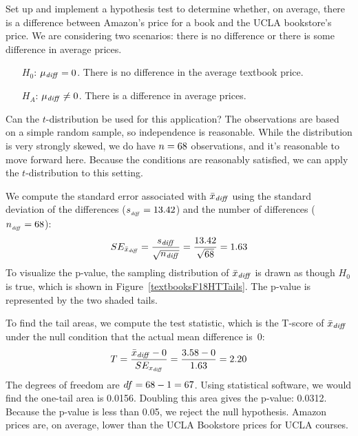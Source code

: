 \begin{examplewrap}
\begin{nexample}{Set up and implement a hypothesis test to determine whether, on average, there is a difference between Amazon's price for a book and the UCLA bookstore's price.}
\label{htForDiffInUCLAAndAmazonTextbookPrices}
We are considering two scenarios: there is no difference or there is some difference in average prices.
\begin{itemize}
\setlength{\itemsep}{0mm}
\item[$H_0$:] $\mu_{\text{\emph{diff}}}=0$. There is no difference in the average textbook price.
\item[$H_A$:] $\mu_{\text{\emph{diff}}} \neq 0$. There is a difference in average prices.
\end{itemize}

Can the $t$-distribution be used for this application?
The observations are based on a simple random sample,
so independence is reasonable.
While the distribution is very strongly skewed,
we do have $n = 68{}$ observations,
and it's reasonable to move forward here.
Because the conditions are reasonably satisfied,
we can apply the $t$-distribution to this setting.

We compute the standard error associated with
$\bar{x}_{\text{\emph{diff}}}$ using the standard
deviation of the differences
($s_{_{\text{\emph{diff}}}} = 13.42{}$)
and the number of differences
($n_{_{\text{\emph{diff}}}} = 68{}$):
\begin{align*}
SE_{\bar{x}_{\text{\emph{diff}}}}
  = \frac{s_{\text{\emph{diff}}}}{\sqrt{n_{\text{\emph{diff}}}}}
  = \frac{13.42{}}{\sqrt{68{}}} = 1.63{}
\end{align*}
To visualize the p-value, the sampling distribution
of $\bar{x}_{\text{\emph{diff}}}$ is drawn as though
$H_0$ is true, which is shown in
Figure~\ref{textbooksF18HTTails}.
The p-value is represented by the two shaded tails.

To find the tail areas, we compute the test statistic,
which is the T-score of $\bar{x}_{\text{\emph{diff}}}$
under the null condition that the actual mean
difference is~0:
\begin{align*}
T
  = \frac{\bar{x}_{\text{\emph{diff}}} - 0}
      {SE_{x_{\text{\emph{diff}}}}}
  = \frac{3.58{} - 0}{1.63{}} = 2.20
\end{align*}
The degrees of freedom are $df = 68{} - 1 = 67$.
Using statistical software, we would find the
one-tail area is 0.0156.
Doubling this area gives the p-value: 0.0312.
Because the p-value is less than 0.05,
we reject the null hypothesis.
Amazon prices are, on average, lower than the
UCLA Bookstore prices for UCLA courses.
\end{nexample}
\end{examplewrap}

